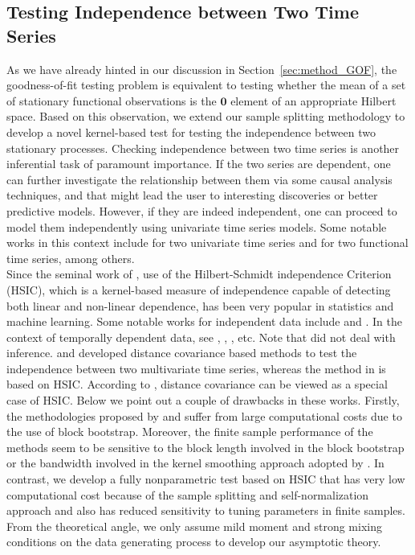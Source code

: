 \documentclass[11pt]{article}
\theoremstyle{plain}
\theoremstyle{definition}
\theoremstyle{remark}
\begin{document}
\subsection{Testing Independence between Two Time Series }\label{sec:method_extensions}


As we have already hinted in our discussion in Section~\ref{sec:method_GOF}, the goodness-of-fit testing problem is equivalent to testing whether the mean of a set of stationary functional observations is the $\mathbf{0}$ element of an appropriate Hilbert space. Based on this observation, we extend our sample splitting methodology to develop a novel kernel-based test for testing the independence between two stationary processes. Checking independence between two time series is another inferential task of paramount importance. If the two series are dependent, one can further investigate the relationship between them via some causal analysis techniques, and that might lead the user to interesting discoveries or better predictive models. However, if they are indeed independent, one can proceed to model them independently using univariate time series models. Some notable works in this context include \cite{hong1996testing, hong2001testing, shao2009generalized} for two univariate time series and \cite{horvath2015testing} for two functional time series, among others.\\

\indent Since the seminal work of \cite{gretton2005measuring}, use of the Hilbert-Schmidt independence Criterion (HSIC), which is a kernel-based measure of independence capable of detecting both linear and non-linear dependence, has been very popular in statistics and machine learning. 
Some notable works for independent data include \cite{gretton2007kernel} and \cite{gretton2010consistent}. In the context of temporally dependent data, see \cite{zhang2008kernel}, \cite{zhou2012measuring}, \cite{wang2021new}, \cite{chu2023distance} etc. Note that \cite{zhang2008kernel} did not deal with inference. \cite{chu2023distance} and \cite{betken2021bootstrap} developed  distance covariance based methods to test the independence between two multivariate time series, whereas 
 the method in \cite{wang2021new} is based on HSIC. According to \cite{sejdinovic2013equivalence}, distance covariance can be viewed as a special case of HSIC. Below we point out a couple of drawbacks in these works. Firstly, the methodologies proposed by \cite{betken2021bootstrap} and \cite{wang2021new} suffer from large computational costs due to the use of block bootstrap. Moreover, the finite sample performance of the methods seem to be sensitive to the block length involved in the block bootstrap or the bandwidth involved in the kernel smoothing approach adopted by \cite{chu2023distance}. In contrast, we develop a fully nonparametric test based on HSIC that has very low computational cost because of the sample splitting and self-normalization approach and also has reduced sensitivity to tuning parameters in finite samples. From the theoretical angle, we only assume mild moment and strong mixing conditions on the data generating process to develop our asymptotic theory. \\
\end{document}
